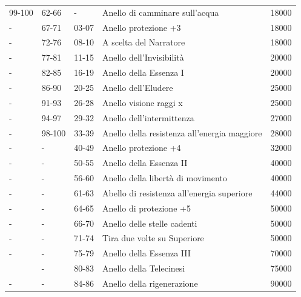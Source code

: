 \documentclass[a4paper,11pt,twoside,openany]{book}
\begin{document}
\begin{tabular}{L{2cm} L{2cm} L{2cm} L{8cm} L{2cm}}
	99-100           & 62-66              & - & Anello di camminare sull'acqua     & 18000\\
	-& 67-71              & 03-07             & Anello protezione +3    & 18000\\
	-& 72-76              & 08-10             & A scelta del Narratore  & 18000\\
	-& 77-81              & 11-15             & Anello dell'Invisibilità                & 20000\\
	-& 82-85              & 16-19             & Anello della Essenza I      & 20000\\
	-& 86-90              & 20-25             & Anello dell'Eludere          & 25000\\
	-& 91-93              & 26-28             & Anello visione raggi x    & 25000\\
	-& 94-97              & 29-32             & Anello dell'intermittenza              & 27000\\
	-& 98-100             & 33-39             & Anello della resistenza all'energia maggiore            & 28000\\
	-& -  & 40-49             & Anello protezione +4    & 32000\\
	-& -  & 50-55             & Anello della Essenza II & 40000\\
	-& -  & 56-60             & Anello della libertà di movimento              & 40000\\
	-& -  & 61-63             & Abello di resistenza all'energia superiore              & 44000\\
	-& -  & 64-65             & Anello di protezione +5 & 50000\\
	-& -  & 66-70             & Anello delle stelle cadenti           & 50000\\
	-& -  & 71-74             & Tira due volte su Superiore             & 50000\\
	-& -  & 75-79             & Anello della Essenza III& 70000\\
	 & -  & 80-83             & Anello della Telecinesi  & 75000\\
	-& -  & 84-86             & Anello della rigenerazione            & 90000\\

\end{tabular}
\end{document}
